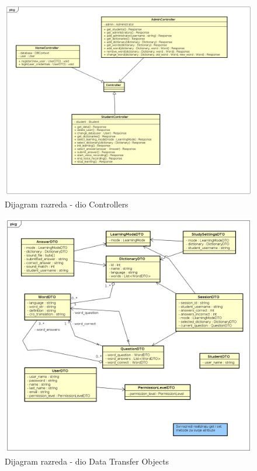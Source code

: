 			\begin{figure}[H]
				\includegraphics[width=\textwidth]{dijagrami/classcont.png} %
				\caption{Dijagram razreda - dio Controllers}
				\label{fig:classcont} %
			\end{figure}

			\begin{figure}[H]
				\includegraphics[width=\textwidth]{dijagrami/classdto.png} %
				\caption{Dijagram razreda - dio Data Transfer Objects}
				\label{fig:classdto} %
			\end{figure}

